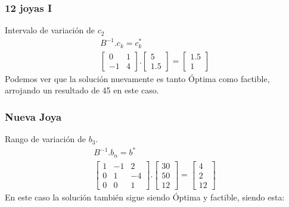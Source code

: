 \begin{homeworkProblem}
\subsubsection{12 joyas \RN{1}}
Intervalo de variación de $c_2$
\begin{align*}
B^{-1}.c_k=c_k^{*}\\
    \begin{bmatrix}
        0 & 1 \\
        -1 & 4
    \end{bmatrix}.
    \begin{bmatrix}
        5 \\
        1.5        
    \end{bmatrix}=
    \begin{bmatrix}
        1.5 \\
        1
    \end{bmatrix}
\end{align*}
Podemos ver que la solución nuevamente es tanto Óptima como factible, arrojando un resultado de 45 en este caso.

\subsubsection{Nueva Joya}
Rango de variación de $b_3$.
\begin{align*}
    B^{-1}.b_n = b^{*} \\
    \begin{bmatrix}
        1 & -1 & 2 \\
        0 & 1 & -4 \\
        0 & 0 & 1 
    \end{bmatrix}.
    \begin{bmatrix}
        30 \\
        50 \\
        12
    \end{bmatrix}=
    \begin{bmatrix}
        4 \\
        2\\
        12
    \end{bmatrix}
\end{align*}
En este caso la solución también sigue siendo Óptima y factible, siendo esta:
\end{homeworkProblem}

